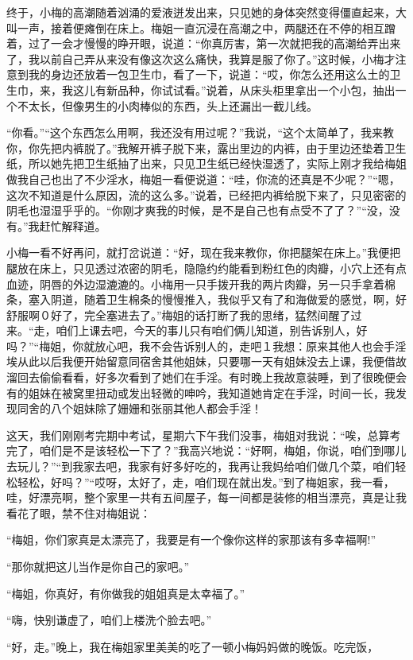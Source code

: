\documentclass[12pt,UTF8]{ctexbook}
\begin{document}
终于，小梅的高潮随着汹涌的爱液迸发出来，只见她的身体突然变得僵直起来，大叫一声，接着便瘫倒在床上。梅姐一直沉浸在高潮之中，两腿还在不停的相互蹭着，过了一会才慢慢的睁开眼，说道：“你真厉害，第一次就把我的高潮给弄出来了，我以前自己弄从来没有像这次这么痛快，我算是服了你了。”这时候，小梅才注意到我的身边还放着一包卫生巾，看了一下，说道：“哎，你怎么还用这么土的卫生巾，来，我这儿有新品种，你试试看。”说着，从床头柜里拿出一个小包，抽出一个不太长，但像男生的小肉棒似的东西，头上还漏出一截儿线。

“你看。”“这个东西怎么用啊，我还没有用过呢？”我说，“这个太简单了，我来教你，你先把内裤脱了。”我解开裤子脱下来，露出里边的内裤，由于里边还垫着卫生纸，所以她先把卫生纸抽了出来，只见卫生纸已经快湿透了，实际上刚才我给梅姐做我自己也出了不少淫水，梅姐一看便说道：“哇，你流的还真是不少呢？”“嗯，这次不知道是什么原因，流的这么多。”说着，已经把内裤给脱下来了，只见密密的阴毛也湿湿乎乎的。“你刚才爽我的时候，是不是自己也有点受不了了？”“没，没有。”我赶忙解释道。

小梅一看不好再问，就打岔说道：“好，现在我来教你，你把腿架在床上。”我便把腿放在床上，只见透过浓密的阴毛，隐隐约约能看到粉红色的肉瓣，小穴上还有点血迹，阴唇的外边湿漉漉的。小梅用一只手拨开我的两片肉瓣，另一只手拿着棉条，塞入阴道，随着卫生棉条的慢慢推入，我似乎又有了和海做爱的感觉，啊，好舒服啊０好了，完全塞进去了。”梅姐的话打断了我的思绪，猛然间醒了过来。“走，咱们上课去吧，今天的事儿只有咱们俩儿知道，别告诉别人，好吗？”“梅姐，你就放心吧，我不会告诉别人的，走吧１我想：原来其他人也会手淫埃从此以后我便开始留意同宿舍其他姐妹，只要哪一天有姐妹没去上课，我便借故溜回去偷偷看看，好多次看到了她们在手淫。有时晚上我故意装睡，到了很晚便会有的姐妹在被窝里扭动或发出轻微的呻吟，我知道她肯定在手淫，时间一长，我发现同舍的八个姐妹除了姗姗和张丽其他人都会手淫！

这天，我们刚刚考完期中考试，星期六下午我们没事，梅姐对我说：“唉，总算考完了，咱们是不是该轻松一下了？”我高兴地说：“好啊，梅姐，你说，咱们到哪儿去玩儿？”“到我家去吧，我家有好多好吃的，我再让我妈给咱们做几个菜，咱们轻松轻松，好吗？”“哎呀，太好了，走，咱们现在就出发。”到了梅姐家，我一看，哇，好漂亮啊，整个家里一共有五间屋子，每一间都是装修的相当漂亮，真是让我看花了眼，禁不住对梅姐说：

“梅姐，你们家真是太漂亮了，我要是有一个像你这样的家那该有多幸福啊!”

“那你就把这儿当作是你自己的家吧。”

“梅姐，你真好，有你做我的姐姐真是太幸福了。”

“嗨，快别谦虚了，咱们上楼洗个脸去吧。”

“好，走。”晚上，我在梅姐家里美美的吃了一顿小梅妈妈做的晚饭。吃完饭，
\end{document}
